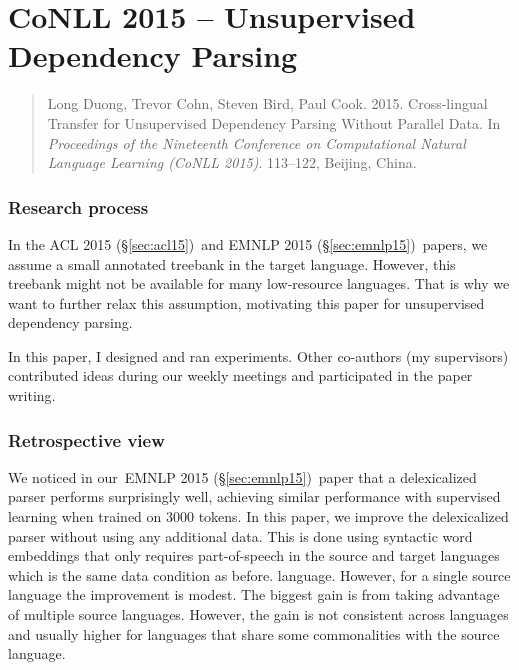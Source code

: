 \documentclass[12pt,twoside,final,hidelinks]{ltthesis}
\theoremstyle{definition}
\newcommand\aclv{ACL 2015 (\S\ref{sec:acl15})}
\newcommand\emnlpv{EMNLP 2015 (\S\ref{sec:emnlp15})}
\begin{document}


\section{CoNLL 2015 --  Unsupervised Dependency Parsing}
\label{sec:conll15}
\begin{quote}
Long Duong, Trevor Cohn, Steven Bird, Paul Cook. 2015. Cross-lingual Transfer for Unsupervised Dependency Parsing Without Parallel Data. 
In \textit{Proceedings of the Nineteenth Conference on Computational Natural Language Learning (CoNLL 2015)}. 113--122, Beijing, China. 
\end{quote}

\subsubsection{Research process}
In the \aclv\ and \emnlpv\ papers, we assume a small annotated treebank in the target language. However, this treebank might not be available for 
many low-resource languages. That is why we want to further relax this assumption, motivating this paper for unsupervised dependency parsing. 

In this paper, I designed and ran experiments. Other co-authors (my supervisors) contributed ideas during our weekly 
meetings and participated in the paper writing. 

\subsubsection{Retrospective view}
We noticed in our~\emnlpv\ paper that a delexicalized parser performs surprisingly well, achieving similar performance with supervised learning when trained on 3000 tokens. In this paper, we improve the delexicalized parser without using any additional data. This 
is done using syntactic word embeddings that only requires part-of-speech in the source and target languages which is the same data condition as before.  
language. However, for a single source language the improvement is modest. The biggest 
gain is from taking advantage of multiple source languages. However, the gain is not consistent across languages and usually higher for languages that share 
some commonalities with the source language. 
\end{document}
